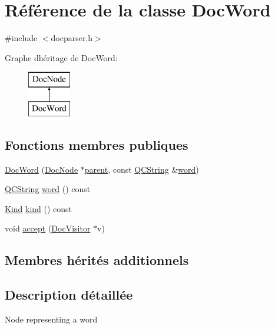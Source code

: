 \hypertarget{class_doc_word}{}\section{Référence de la classe Doc\+Word}
\label{class_doc_word}


{\ttfamily \#include $<$docparser.\+h$>$}

Graphe d\textquotesingle{}héritage de Doc\+Word\+:\begin{figure}[H]
\begin{center}
\leavevmode
\includegraphics[height=2.000000cm]{class_doc_word}
\end{center}
\end{figure}
\subsection*{Fonctions membres publiques}
\begin{DoxyCompactItemize}
\item 
\hyperlink{class_doc_word_a73bddea7072aff79b8ea69ce961d5c8f}{Doc\+Word} (\hyperlink{class_doc_node}{Doc\+Node} $\ast$\hyperlink{class_doc_node_a990d8b983962776a647e6231d38bd329}{parent}, const \hyperlink{class_q_c_string}{Q\+C\+String} \&\hyperlink{class_doc_word_afb32c37afaaab3df0c7714c708d25aed}{word})
\item 
\hyperlink{class_q_c_string}{Q\+C\+String} \hyperlink{class_doc_word_afb32c37afaaab3df0c7714c708d25aed}{word} () const 
\item 
\hyperlink{class_doc_node_aebd16e89ca590d84cbd40543ea5faadb}{Kind} \hyperlink{class_doc_word_a03be3d15f272974e08d22f415cc38bc3}{kind} () const 
\item 
void \hyperlink{class_doc_word_a68a82c3d5879eee5e06214f42667f224}{accept} (\hyperlink{class_doc_visitor}{Doc\+Visitor} $\ast$v)
\end{DoxyCompactItemize}
\subsection*{Membres hérités additionnels}


\subsection{Description détaillée}
Node representing a word 

